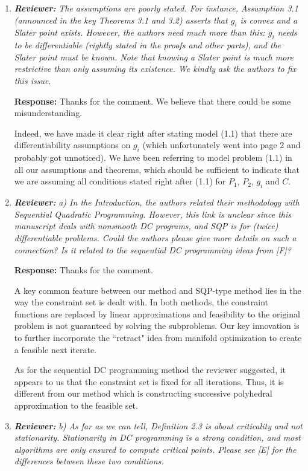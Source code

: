 \documentclass{article}
\begin{document}
\begin{enumerate}
    \item \textit{\textbf{Reviewer:}} {\it The assumptions are poorly stated. For instance, Assumption 3.1 (announced in the key Theorems 3.1 and 3.2) asserts that $g_i$ is convex and a Slater point exists. However, the authors need much more than this: $g_i$ needs to be differentiable (rightly stated in the proofs and other parts), and the Slater point must be known. Note that knowing a Slater point is much more restrictive than only assuming its existence. We kindly ask the authors to fix this issue.}

    \textbf{Response:} Thanks for the comment. We believe that there could be some misunderstanding.

    Indeed, we have made it clear right after stating model (1.1) that there are differentiability assumptions on $g_i$ (which unfortunately went into page 2 and probably got unnoticed). We have been referring to model problem (1.1) in all our assumptions and theorems, which should be sufficient to indicate that we are assuming all conditions stated right after (1.1) for $P_1$, $P_2$, $g_i$ and $C$.

	\item \textit{\textbf{Reviewer:}} \textit{ a) In the Introduction, the authors related their methodology with Sequential Quadratic Programming. However, this link is unclear since this manuscript deals with nonsmooth DC programs, and SQP is for (twice) differentiable problems. Could the authors please give more details on such a connection? Is it related to the sequential DC programming ideas from [F]?}
	
	\textbf{Response:} Thanks for the comment.

    A key common feature between our method and SQP-type method lies in the way the constraint set is dealt with. In both methods, the constraint functions are replaced by linear approximations and feasibility to the original problem is not guaranteed by solving the subproblems. Our key innovation is to further incorporate the ``retract" idea from manifold optimization to create a feasible next iterate.

    As for the sequential DC programming method the reviewer suggested, it appears to us that the constraint set is fixed for all iterations. Thus, it is different from our method which is constructing successive polyhedral approximation to the feasible set.
	
	\item \textit{\textbf{Reviewer:}} \textit{ b) As far as we can tell, Definition 2.3 is about criticality and not stationarity. Stationarity in DC programming is a strong condition, and most algorithms are only ensured to compute critical points. Please see [E] for the differences between these two conditions.}
	

\end{enumerate}
\end{document}
